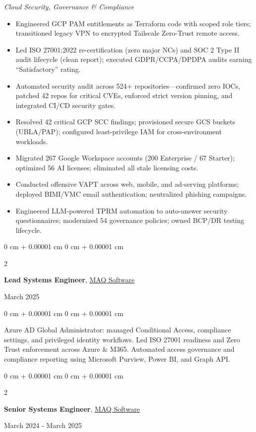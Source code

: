 \documentclass[10pt, letterpaper]{article}
\newenvironment{highlights}{
    \begin{itemize}[
        topsep=0.10 cm,
        parsep=0.10 cm,
        partopsep=0pt,
        itemsep=0pt,
        leftmargin=0 cm + 10pt
    ]
}{
    \end{itemize}
}
\newenvironment{onecolentry}{
    \begin{adjustwidth}{
        0 cm + 0.00001 cm
    }{
        0 cm + 0.00001 cm
    }
}{
    \end{adjustwidth}
}
\newenvironment{twocolentry}[2][]{
    \onecolentry
    \def\secondColumn{#2}
    \setcolumnwidth{\fill, 4.5 cm}
    \begin{paracol}{2}
}{
    \switchcolumn \raggedleft \secondColumn
    \end{paracol}
    \endonecolentry
}
\begin{document}
\textit{Cloud Security, Governance \& Compliance}
\begin{highlights}
    \item Engineered GCP PAM entitlements as Terraform code with scoped role tiers; transitioned legacy VPN to encrypted Tailscale Zero-Trust remote access.
    \item Led ISO 27001:2022 re-certification (zero major NCs) and SOC 2 Type II audit lifecycle (clean report); executed GDPR/CCPA/DPDPA audits earning ``Satisfactory'' rating.
    \item Automated security audit across 524+ repositories—confirmed zero IOCs, patched 42 repos for critical CVEs, enforced strict version pinning, and integrated CI/CD security gates.
    \item Resolved 42 critical GCP SCC findings; provisioned secure GCS buckets (UBLA/PAP); configured least-privilege IAM for cross-environment workloads.
    \item Migrated 267 Google Workspace accounts (200 Enterprise / 67 Starter); optimized 56 AI licenses; eliminated all stale licensing costs.
    \item Conducted offensive VAPT across web, mobile, and ad-serving platforms; deployed BIMI/VMC email authentication; neutralized phishing campaigns.
    \item Engineered LLM-powered TPRM automation to auto-answer security questionnaires; modernized 54 governance policies; owned BCP/DR testing lifecycle.
\end{highlights}

\vspace{0.2 cm}

\begin{twocolentry}{March 2025}
    \textbf{Lead Systems Engineer}, \href{https://maqsoftware.com/}{MAQ Software}
\end{twocolentry}

\vspace{0.10 cm}
\begin{onecolentry}
    Azure AD Global Administrator: managed Conditional Access, compliance settings, and privileged identity workflows. Led ISO 27001 readiness and Zero Trust enforcement across Azure \& M365. Automated access governance and compliance reporting using Microsoft Purview, Power BI, and Graph API.
\end{onecolentry}

\vspace{0.2 cm}

\begin{twocolentry}{March 2024 - March 2025}
    \textbf{Senior Systems Engineer}, \href{https://maqsoftware.com/}{MAQ Software}
\end{twocolentry}
\end{document}

